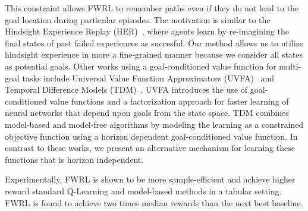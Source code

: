 This constraint allows FWRL to remember paths even if they do not lead
to the goal location during particular episodes. The motivation is
similar to the Hindsight Experience Replay
(HER)~\citep{anderson2017vision}, where agents learn by re-imagining the
final states of past failed experiences as succesful. Our method allows
us to utilize hindsight experience in more a fine-grained manner because
we consider all states as potential goals. Other works using a
goal-conditioned value function for multi-goal tasks include Universal
Value Function Approximators (UVFA)~\citep{schaul2015universal} and
Temporal Difference Models (TDM)~\citep{pong2018temporal}. UVFA
introduces the use of goal-conditioned value functions and a
factorization approach for faster learning of neural networks that
depend upon goals from the state space.  TDM combines model-based and
model-free algorithms by modeling the learning as a constrained
objective function using a horizon dependent goal-conditioned value
function. In contrast to these works, we present an alternative
mechanism for learning these functions that is horizon independent.  

Experimentally, FWRL is shown to be more sample-efficient and achieve higher
reward standard Q-Learning and model-based methods in a tabular setting. FWRL is
found to achieve two times median rewards than the next best baseline.





